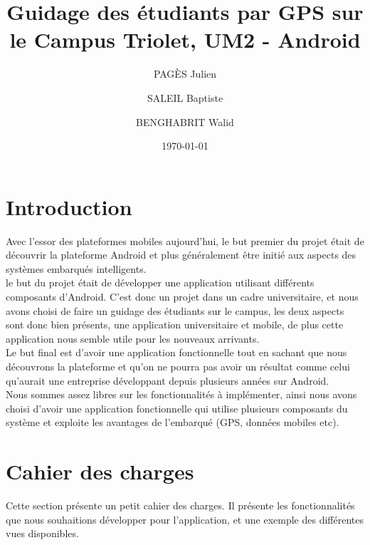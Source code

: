 \documentclass{article}
\title{Guidage des étudiants par GPS sur le Campus Triolet, UM2 - Android}
\author{PAGÈS Julien \and SALEIL Baptiste \and BENGHABRIT Walid}
\date{\today}
\begin{document}
	\maketitle
	\thispagestyle{empty}
	
	\newpage
	\tableofcontents
	
	\newpage
	\section{Introduction}
	Avec l'essor des plateformes mobiles aujourd'hui, le but premier du projet était de découvrir la plateforme Android et plus généralement être initié aux aspects des systèmes embarqués intelligents. \\
	le but du projet était de développer une application utilisant différents composants d'Android.
	C'est donc un projet dans un cadre universitaire, et nous avons choisi de faire un guidage des étudiants sur le campus, les deux aspects sont donc bien présents, une application universitaire et mobile, de plus cette application nous semble utile pour les nouveaux arrivants. \\
	Le but final est d'avoir une application fonctionnelle tout en sachant que nous découvrons la plateforme et qu'on ne pourra pas avoir un résultat comme celui qu'aurait une entreprise développant depuis plusieurs années sur Android. \\
	Nous sommes assez libres sur les fonctionnalités à implémenter, ainsi nous avons choisi d'avoir une application fonctionnelle qui utilise plusieurs composants du système et exploite les avantages de l'embarqué (GPS, données mobiles etc). \\
	
	\section{Cahier des charges}
	Cette section présente un petit cahier des charges.
	Il présente les fonctionnalités que nous souhaitions développer pour l'application, et une exemple des différentes vues disponibles.
	
\end{document}
